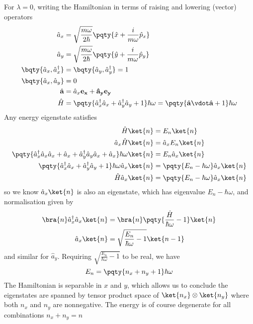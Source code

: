 \documentclass[12pt]{article}
\begin{document}
        \subsection{} \subsubsection{} For \(\lambda = 0\), writing the Hamiltonian in terms of raising and lowering (vector) operators 
        \begin{align*}
            \hat{a}_x &= \sqrt{\frac{m\omega}{2\hbar} }\pqty{\hat{x} + \frac{i}{m\omega} \hat{p}_x}\\
            \hat{a}_y &= \sqrt{\frac{m\omega}{2\hbar} }\pqty{\hat{y} + \frac{i}{m\omega} \hat{p}_y}\\
            \bqty{\hat{a}_x , \hat{a}_x^\dagger} &= \bqty{\hat{a}_y , \hat{a}_y^\dagger} = 1\\
            \bqty{\hat{a}_x , \hat{a}_y} &=  0\\
            \hat{\bf a} &= \hat{a}_x\bf e_x + \hat{a}_y\bf e_y\\
            \hat{H} &= \pqty{\hat{a}_x^\dagger \hat{a}_x + \hat{a}_y^\dagger \hat{a}_y + 1}\hbar \omega = \pqty{\hat{\bf a} \vdot \hat{\bf a} + 1}\hbar\omega
        \end{align*}
        Any energy eigenstate satisfies \begin{align*}
            \hat{H} \ket{n} &= E_n \ket{n} \\
            \hat{a}_x \hat{H} \ket{n} &= \hat{a}_x E_n \ket{n} \\
            \pqty{\hat{a}_x^\dagger \hat{a}_x \hat{a}_x + \hat{a}_x + \hat{a}_y^\dagger \hat{a}_y \hat{a}_x + \hat{a}_x}\hbar \omega\ket{n} &= E_n \hat{a}_x \ket{n} \\
            \pqty{\hat{a}_x^\dagger \hat{a}_x + \hat{a}_y^\dagger \hat{a}_y  + 1}\hbar \omega \hat{a}_x\ket{n} &= \pqty{E_n - \hbar \omega} \hat{a}_x \ket{n} \\
            \hat{H} \hat{a}_x\ket{n} &= \pqty{E_n - \hbar \omega} \hat{a}_x \ket{n}
        \end{align*}
        so we know \(\hat{a}_x \ket{n} \) is also an eigenstate, which has eigenvalue \(E_n - \hbar\omega\), and normalisation given by \begin{align*}
            \bra{n} \hat{a}_x^\dagger \hat{a}_x \ket{n} &= \bra{n} \pqty{\frac{\hat{H}}{\hbar\omega} - 1} \ket{n} \\
            \hat{a}_x \ket{n} &= \sqrt{\frac{E_n}{\hbar \omega} - 1} \ket{n - 1} 
        \end{align*}
        and similar for \(\hat{a}_y\). Requiring \(\sqrt{\frac{E_n}{\hbar \omega} - 1}\) to be real, we have \[
            E_n = \pqty{n_x + n_y + 1}\hbar\omega
        \]
        The Hamiltonian is separable in \(x\) and \(y\), which allows us to conclude the eigenstates are spanned by tensor product space of \(\ket{n_x} \otimes \ket{n_y} \) where both \(n_x\) and \(n_y\) are nonnegative. The energy is of course degenerate for all combinations \(n_x + n_y = n\)
\end{document}
